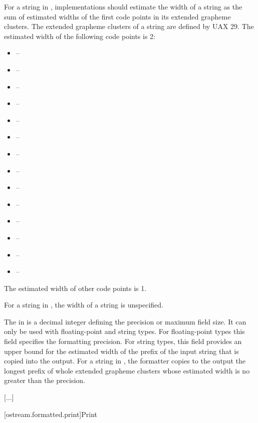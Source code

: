 \documentclass{wg21}
\begin{document}
\pnum
For a string in ,
implementations should estimate the width of a string
as the sum of estimated widths of
the first code points in its extended grapheme clusters.
The extended grapheme clusters of a string are defined by UAX 29.
The estimated width of the following code points is 2:
\begin{itemize}
	\item {} -- 
	\item {} -- 
	\item {} -- 
	\item {} -- 
	\item {} -- 
	\item {} -- 
	\item {} -- 
	\item {} -- 
	\item {} -- 
	\item {} -- 
	\item {} -- 
	\item {} -- 
	\item {} -- 
	\item {} -- 
\end{itemize}
The estimated width of other code points is 1.

\pnum
For a string in , the width of a string is unspecified.

\pnum
The  in
 is a decimal integer defining
the precision or maximum field size.
It can only be used with floating-point and string types.
For floating-point types this field specifies the formatting precision.
For string types, this field provides an upper bound
for the estimated width of the prefix of
the input string that is copied into the output.
For a string in ,
the formatter copies to the output
the longest prefix of whole extended grapheme clusters
whose estimated width is no greater than the precision.

\textcolor{noteclr}{[...]}

[ostream.formatted.print]{Print}{}
\end{document}
